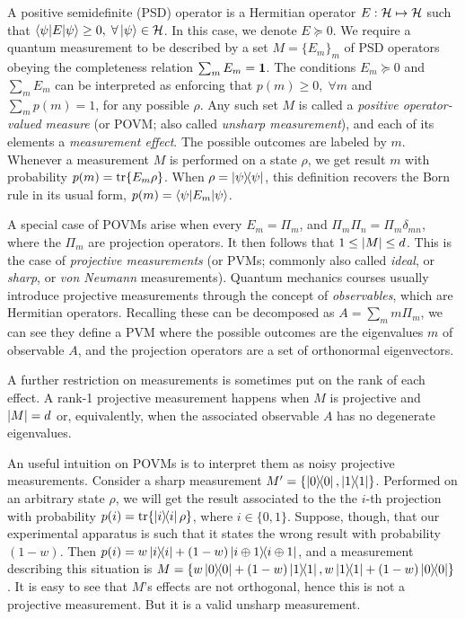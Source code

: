 		A positive semidefinite (PSD) operator is a Hermitian operator $E : \mathcal{H} \mapsto \mathcal{H}$ such that $\left\langle \psi \middle\vert E \middle\vert \psi \right\rangle \geq 0, \;\forall \ket{\psi} \in \mathcal{H}$. In this case, we denote $E \succeq 0$. We require a quantum measurement to be described by a set $M = \{ E_m \}_m$ of PSD operators obeying the completeness relation $\sum_m E_m = \mathbf{1}$. The conditions $E_m \succeq 0$ and $\sum_m E_m$ can be interpreted as enforcing that $p(m) \geq 0, \;\forall m$ and $\sum_m p(m) = 1$, for any possible $\rho$. Any such set $M$ is called a \emph{positive operator-valued measure} (or POVM; also called \emph{unsharp measurement}), and each of its elements a \emph{measurement effect}. The possible outcomes are labeled by $m$. Whenever a measurement $M$ is performed on a state $\rho$, we get result $m$ with probability $p(m) = \tr{E_m \rho}$. When $\rho = \ketbra{\psi}{\psi}$, this definition recovers the Born rule in its usual form, $p(m) = \left\langle \psi \middle\vert E_m \middle\vert \psi \right\rangle$.
		
		A special case of POVMs arise when every $E_m = \Pi_m$, and $\Pi_m \Pi_n = \Pi_m \delta_{mn}$, where the $\Pi_m$ are projection operators. It then follows that $1 \leq \abs{M} \leq d$. This is the case of \emph{projective measurements} (or PVMs; commonly also called \emph{ideal}, or \emph{sharp}, or \emph{von Neumann} measurements). Quantum mechanics courses usually introduce projective measurements through the concept of \emph{observables}, which are Hermitian operators. Recalling these can be decomposed as $A = \sum_m m \Pi_m$, we can see they define a PVM where the possible outcomes are the eigenvalues $m$ of observable $A$, and the projection operators are a set of orthonormal eigenvectors.
		
		A further restriction on measurements is sometimes put on the rank of each effect. A rank-1 projective measurement happens when $M$ is projective and $\abs{M} = d$ or, equivalently, when the associated observable $A$ has no degenerate eigenvalues.
		
		An useful intuition on POVMs is to interpret them as noisy projective measurements. Consider a sharp measurement $M^\prime = \{ \ketbra{0}{0}, \ketbra{1}{1} \}$. Performed on an arbitrary state $\rho$, we will get the result associated to the the $i$-th projection with probability $p(i) = \tr{\ketbra{i}{i} \rho}$, where $i \in \{0, 1\}$. Suppose, though, that our experimental apparatus is such that it states the wrong result with probability $(1 - w)$. Then $p(i) = w \ketbra{i}{i} + (1 - w) \ketbra{i \oplus1}{i \oplus 1}$, and a measurement describing this situation is $M = \{ w \ketbra{0}{0} + (1 - w) \ketbra{1}{1}, w \ketbra{1}{1} + (1 - w) \ketbra{0}{0} \}$. It is easy to see that $M$'s effects are not orthogonal, hence this is not a projective measurement. But it is a valid unsharp measurement.
		
